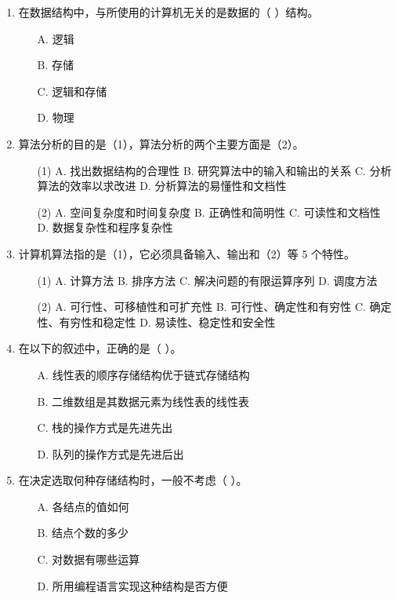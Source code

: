 \documentclass[12pt, a4paper]{article}
\begin{document}
\begin{enumerate}
    \item 在数据结构中，与所使用的计算机无关的是数据的（ ）结构。
    \begin{enumerate}
        \item[A.] 逻辑
        \item[B.] 存储
        \item[C.] 逻辑和存储
        \item[D.] 物理
    \end{enumerate}
    
    \item 算法分析的目的是（1），算法分析的两个主要方面是（2）。
    \begin{enumerate}
        \item[(1)] A. 找出数据结构的合理性 \quad B. 研究算法中的输入和输出的关系 \quad C. 分析算法的效率以求改进 \quad D. 分析算法的易懂性和文档性
        \item[(2)] A. 空间复杂度和时间复杂度 \quad B. 正确性和简明性 \quad C. 可读性和文档性 \quad D. 数据复杂性和程序复杂性
    \end{enumerate}
    
    \item 计算机算法指的是（1），它必须具备输入、输出和（2）等 5 个特性。
    \begin{enumerate}
        \item[(1)] A. 计算方法 \quad B. 排序方法 \quad C. 解决问题的有限运算序列 \quad D. 调度方法
        \item[(2)] A. 可行性、可移植性和可扩充性 \quad B. 可行性、确定性和有穷性 \quad C. 确定性、有穷性和稳定性 \quad D. 易读性、稳定性和安全性
    \end{enumerate}
    
    \item 在以下的叙述中，正确的是（ ）。
    \begin{enumerate}
        \item[A.] 线性表的顺序存储结构优于链式存储结构
        \item[B.] 二维数组是其数据元素为线性表的线性表
        \item[C.] 栈的操作方式是先进先出
        \item[D.] 队列的操作方式是先进后出
    \end{enumerate}
    
    \item 在决定选取何种存储结构时，一般不考虑（ ）。
    \begin{enumerate}
        \item[A.] 各结点的值如何
        \item[B.] 结点个数的多少
        \item[C.] 对数据有哪些运算
        \item[D.] 所用编程语言实现这种结构是否方便
    \end{enumerate}
    

\end{enumerate}
\end{document}
